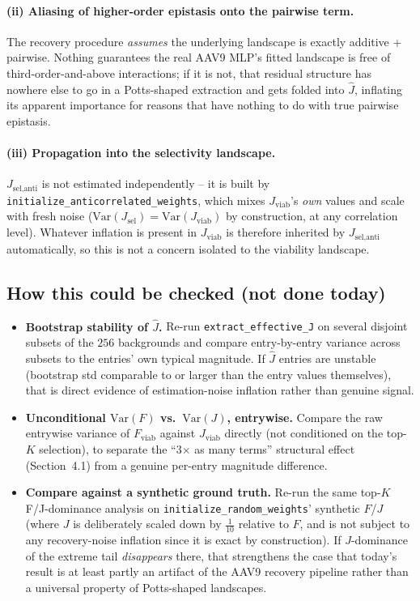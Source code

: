 \documentclass[11pt]{article}
\newcommand{\code}[1]{\texttt{#1}}
\begin{document}
\paragraph{(ii) Aliasing of higher-order epistasis onto the pairwise term.} The recovery procedure
\emph{assumes} the underlying landscape is exactly additive + pairwise. Nothing guarantees the real
AAV9 MLP's fitted landscape is free of third-order-and-above interactions; if it is not, that
residual structure has nowhere else to go in a Potts-shaped extraction and gets folded into
$\hat J$, inflating its apparent importance for reasons that have nothing to do with true pairwise
epistasis.

\paragraph{(iii) Propagation into the selectivity landscape.} $J_{\text{sel,anti}}$ is not estimated
independently -- it is built by \code{initialize\_anticorrelated\_weights}, which mixes
$J_{\text{viab}}$'s \emph{own} values and scale with fresh noise
($\mathrm{Var}(J_{\text{sel}}) = \mathrm{Var}(J_{\text{viab}})$ by construction, at any correlation
level). Whatever inflation is present in $J_{\text{viab}}$ is therefore inherited by
$J_{\text{sel,anti}}$ automatically, so this is not a concern isolated to the viability landscape.

\subsection{How this could be checked (not done today)}

\begin{itemize}
  \item \textbf{Bootstrap stability of $\hat J$.} Re-run \code{extract\_effective\_J} on several
        disjoint subsets of the $256$ backgrounds and compare entry-by-entry variance across
        subsets to the entries' own typical magnitude. If $\hat J$ entries are unstable
        (bootstrap std comparable to or larger than the entry values themselves), that is direct
        evidence of estimation-noise inflation rather than genuine signal.
  \item \textbf{Unconditional $\mathrm{Var}(F)$ vs.\ $\mathrm{Var}(J)$, entrywise.} Compare the raw
        entrywise variance of $F_{\text{viab}}$ against $J_{\text{viab}}$ directly (not conditioned
        on the top-$K$ selection), to separate the ``3$\times$ as many terms'' structural effect
        (Section~4.1) from a genuine per-entry magnitude difference.
  \item \textbf{Compare against a synthetic ground truth.} Re-run the same top-$K$ F/J-dominance
        analysis on \code{initialize\_random\_weights}' synthetic $F$/$J$ (where $J$ is deliberately
        scaled down by $\tfrac{1}{10}$ relative to $F$, and is not subject to any recovery-noise
        inflation since it is exact by construction). If $J$-dominance of the extreme tail
        \emph{disappears} there, that strengthens the case that today's result is at least partly
        an artifact of the AAV9 recovery pipeline rather than a universal property of Potts-shaped
        landscapes.
\end{itemize}
\end{document}
